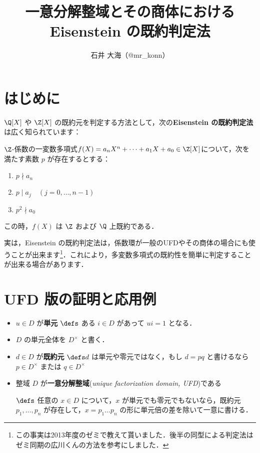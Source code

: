 \documentclass[a4j]{ltjsarticle}
\title{一意分解整域とその商体における Eisenstein の既約判定法}
\author{石井 大海（@mr\_konn）}
\newcommand{\divs}{\mathrel{\mid}}
\begin{document}
\maketitle

\section{はじめに}
$\Q[X]$ や $\Z[X]$ の既約元を判定する方法として，次の{\bfseries Eisenstein の既約判定法}は広く知られています：

\begin{theorem}
 $\Z$-係数の一変数多項式$f(X) = a_n X^n + \dots + a_1 X + a_0 \in \Z[X]$について，次を満たす素数 $p$ が存在するとする：

 \begin{enumerate}[label=(\arabic*)]
  \item $p \nmid a_n$
  \item $p \divs a_j \quad (j = 0, \dots, n-1)$
  \item $p^2 \nmid a_0$
 \end{enumerate}
 この時，$f(X)$ は $\Z$ および $\Q$ 上既約である．
\end{theorem}

実は，Eisenstein の既約判定法は，係数環が一般のUFDやその商体の場合にも使うことが出来ます\footnote{この事実は2013年度のゼミで教えて貰いました．後半の同型による判定法はゼミ同期の広川くんの方法を参考にしました．}．これにより，多変数多項式の既約性を簡単に判定することが出来る場合があります．

\section{UFD 版の証明と応用例}

\begin{definition}
 \begin{itemize}
  \item $u \in D$ が{\bfseries 単元} $\defs$ ある $i \in D$ があって $ui = 1$ となる．
  \item $D$ の単元全体を $D^\times$ と書く．
  \item $d \in D$ が{\bfseries 既約元} $\defs d $ は単元や零元ではなく，もし $d = pq$ と書けるなら $p \in D^\times$ または $q \in D^\times$
  \item 整域 $D$ が{\bfseries 一意分解整域}({\itshape unique factorization domain, UFD})である

  $\defs$ 任意の $x \in D$ について，$x$ が単元でも零元でもないなら，既約元 $p_1, \dots, p_n$ が存在して，$x = p_1 \dots p_n$ の形に単元倍の差を除いて一意に書ける．
 \end{itemize}
\end{definition}
\end{document}
